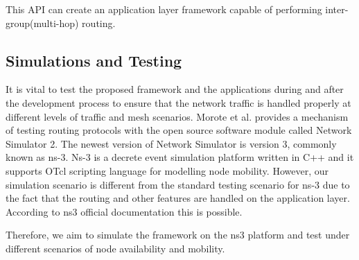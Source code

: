 \vspace{0.1cm}

This API can create an application layer framework capable of performing
inter-group(multi-hop) routing.

\subsection{Simulations and Testing}

It is vital to test the proposed framework and the applications during and
after the development process to ensure that the network traffic is handled
properly at different levels of traffic and mesh scenarios. Morote et al.
provides a mechanism of testing routing protocols with the open source software
module called Network Simulator 2\cite{morote2010}. The newest version of
Network Simulator is version 3, commonly known as ns-3\cite{ns3}. Ns-3 is a
decrete event simulation platform written in C++ and it supports OTcl scripting
language for modelling node mobility\cite{morote2010}. However, our simulation
scenario is different from the standard testing scenario for ns-3 due to the
fact that the routing and other features are handled on the application layer.
According to ns3 official documentation this is possible\cite{ns3}.

Therefore, we aim to simulate the framework on the ns3 platform and test under
different scenarios of node availability and mobility.
